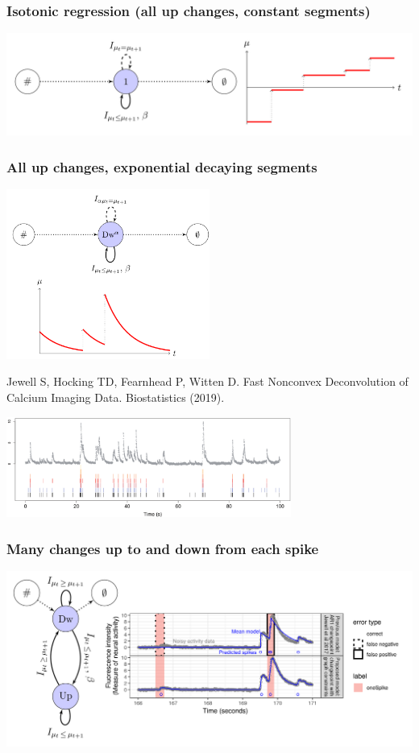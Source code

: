 \documentclass{beamer}
\begin{document}
\begin{frame}
  \frametitle{Isotonic regression (all up changes, constant segments)}
  \includegraphics[width=\textwidth]{gfpop-isotonic}
\end{frame}

\begin{frame}
  \frametitle{All up changes, exponential decaying segments}
  \includegraphics[width=0.5\textwidth]{gfpop-decay}

  Jewell S, Hocking TD, Fearnhead P, Witten D. Fast Nonconvex
  Deconvolution of Calcium Imaging Data. Biostatistics (2019).

  \includegraphics[width=0.7\textwidth]{intro-neuroscience} 

\end{frame}

\begin{frame}
  \frametitle{Many changes up to and down from each spike}
  \includegraphics[width=\textwidth]{gfpop-free-up-down}
\end{frame}
\end{document}
